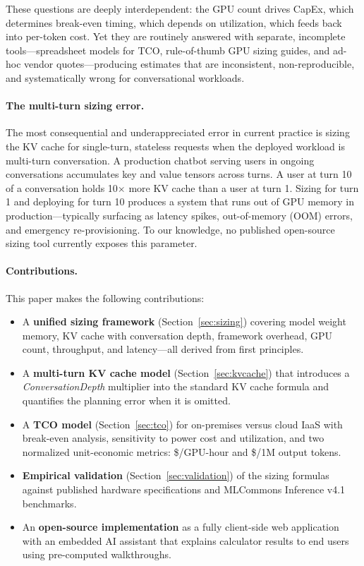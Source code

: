 \documentclass{article}
\begin{document}
These questions are deeply interdependent: the GPU count drives CapEx, which
determines break-even timing, which depends on utilization, which feeds back
into per-token cost. Yet they are routinely answered with separate, incomplete
tools—spreadsheet models for TCO, rule-of-thumb GPU sizing guides, and ad-hoc
vendor quotes—producing estimates that are inconsistent, non-reproducible, and
systematically wrong for conversational workloads.

\paragraph{The multi-turn sizing error.}
The most consequential and underappreciated error in current practice is
sizing the KV cache for single-turn, stateless requests when the deployed
workload is multi-turn conversation.
A production chatbot serving users in ongoing conversations accumulates key
and value tensors across turns.
A user at turn 10 of a conversation holds 10$\times$ more KV cache than a
user at turn 1.
Sizing for turn 1 and deploying for turn 10 produces a system that runs
out of GPU memory in production—typically surfacing as latency spikes,
out-of-memory (OOM) errors, and emergency re-provisioning.
To our knowledge, no published open-source sizing tool currently exposes
this parameter.

\paragraph{Contributions.}
This paper makes the following contributions:

\begin{itemize}
  \item A \textbf{unified sizing framework} (Section~\ref{sec:sizing}) covering
        model weight memory, KV cache with conversation depth, framework
        overhead, GPU count, throughput, and latency—all derived from first
        principles.
  \item A \textbf{multi-turn KV cache model} (Section~\ref{sec:kvcache}) that
        introduces a \emph{ConversationDepth} multiplier into the standard
        KV cache formula and quantifies the planning error when it is omitted.
  \item A \textbf{TCO model} (Section~\ref{sec:tco}) for on-premises versus
        cloud IaaS with break-even analysis, sensitivity to power cost and
        utilization, and two normalized unit-economic metrics: \$/GPU-hour and
        \$/1M output tokens.
  \item \textbf{Empirical validation} (Section~\ref{sec:validation}) of the
        sizing formulas against published hardware specifications and
        MLCommons Inference v4.1 benchmarks.
  \item An \textbf{open-source implementation} as a fully client-side web
        application with an embedded AI assistant that explains calculator
        results to end users using pre-computed walkthroughs.
\end{itemize}
\end{document}
